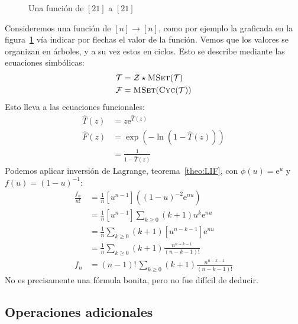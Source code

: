   \begin{figure}[ht]
    \centering
    \caption{Una función de \([21]\) a \([21]\)}
    \label{fig:function-graph}
  \end{figure}
  Consideremos una función de \([n] \rightarrow [n]\),
  como por ejemplo
  la graficada en la figura~\ref{fig:function-graph}
  vía indicar por flechas el valor de la función.
  Vemos que los valores se organizan en árboles,
  y a su vez estos en ciclos.
  Esto se describe mediante las ecuaciones simbólicas:
  \begin{align*}
    \mathcal{T}
      &= \mathcal{Z} \star \operatorname{\textsc{MSet}}(\mathcal{T}) \\
    \mathcal{F}
      &= \operatorname{\textsc{MSet}}(\operatorname{\textsc{Cyc}}(\mathcal{T}))
  \end{align*}
  Esto lleva a las ecuaciones funcionales:
  \begin{align*}
    \widehat{T}(z)
      &= z \mathrm{e}^{\widehat{T}(z)} \\
    \widehat{F}(z)
      &= \exp(- \ln (1 - \widehat{T}(z))) \\
      &= \frac{1}{1 - \widehat{T}(z)}
  \end{align*}
  Podemos aplicar inversión de Lagrange,
  teorema~\ref{theo:LIF},
  con \(\phi(u) = \mathrm{e}^u\) y \(f(u) = (1 - u)^{-1}\):%
  \begin{align*}
    \frac{f_n}{n!}
      &= \frac{1}{n}
	   \left[ u^{n - 1} \right]
	      \left( (1 - u)^{-2} \mathrm{e}^{n u} \right) \\
      &= \frac{1}{n}
	   \left[ u^{n - 1} \right]
	     \sum_{k \ge 0} (k + 1) u^k \mathrm{e}^{n u} \\
      &= \frac{1}{n}
	   \sum_{k \ge 0} (k + 1)
	     \left[ u^{n - k - 1} \right] \mathrm{e}^{n u} \\
      &= \frac{1}{n}
	   \sum_{k \ge 0} (k + 1)
	     \frac{n^{n - k - 1}}{(n - k - 1)!} \\
    f_n
      &= (n - 1)! \, \sum_{k \ge 0} (k + 1)
	   \frac{n^{n - k - 1}}{(n - k - 1)!}
  \end{align*}
  No es precisamente una fórmula bonita,
  pero no fue difícil de deducir.

\subsection{Operaciones adicionales}
\label{sec:ms-egf-operaciones-extra}

